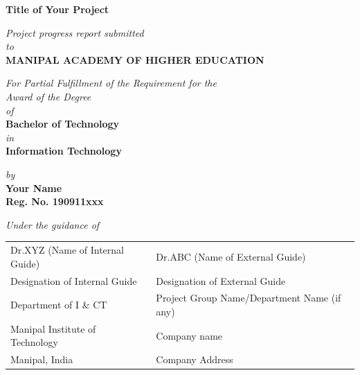 \documentclass[a4paper,12pt]{article}
\begin{document}
\begin{titlepage}
\vspace*{2cm}
	\begin{center}
	\large{\textbf{Title of Your Project}}
	\end{center}
	\vspace{0.5cm}
	\begin{center}
	\small{\textit{Project progress report submitted} \\ \vspace{0.25cm} \textit{to} \\ \vspace{0.25cm}\textbf{MANIPAL ACADEMY OF HIGHER EDUCATION} \\}
	\end{center}
	\vspace{0.25cm}
	\begin{center}
	\small{\textit{For Partial Fulfillment of the Requirement for the\\ \vspace{0.25cm}Award of the Degree\\ \vspace{0.25cm}of}} \\ \vspace{0.25cm}
	\textbf{Bachelor of Technology} \\  \vspace{0.25cm} \textit{in} \\ \textbf{Information Technology}
	\end{center}
	
	\begin{center}
	\small{\textit{by}} \\
	\textbf{Your Name} \\ \textbf{Reg. No. 190911xxx} \\
	\end{center}


\begin{center}
	\small{\textit{Under the guidance of}} \\
\renewcommand{\baselinestretch}{1}
{	
\begin{table}[h]
	\centering
		\begin{tabular}{p{3in} p{3in}}
			Dr.XYZ (Name of Internal Guide) &  Dr.ABC (Name of External Guide)  \\
			Designation of Internal Guide &    Designation of External Guide \\
			Department of I \& CT  &  Project Group Name/Department Name (if any) \\
			 Manipal Institute of Technology& Company name \\
			Manipal, India &  Company Address 
		\end{tabular}
\end{table}
}


\end{center}
\end{titlepage}
\end{document}
